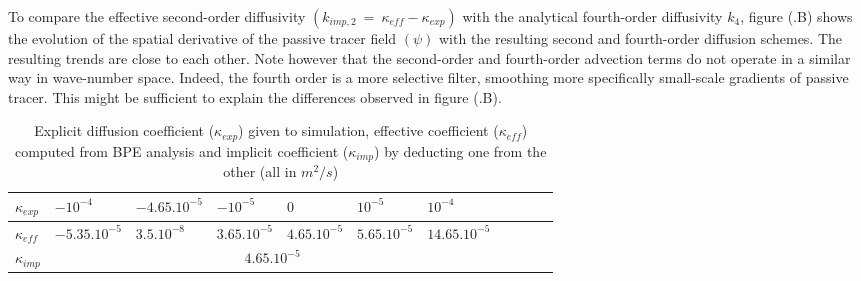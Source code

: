 To compare the effective second-order diffusivity $(k_{imp,2}\ =\ \kappa_{eff}-\kappa_{exp})$ with the analytical fourth-order diffusivity $k_4$, figure (.B) shows the evolution of the spatial derivative of the passive tracer field $(\psi)$ with the resulting second and fourth-order diffusion schemes. The resulting trends are close to each other.
Note however that the second-order and fourth-order advection terms do not operate in a similar way in wave-number space. Indeed, the fourth order is a more selective filter, smoothing more specifically small-scale gradients of passive tracer. This might be sufficient to explain the differences observed in figure (.B).
\begin{table}[h!]
\centering
\begin{tabular}{|l|l|l|l|l|l|l|l|l|l|l|}
\hline
$\kappa_{exp}$ & $-10^{-4}$ &$-4.65.10^{-5}$ & $-10^{-5}$& $0$& $10^{-5}$& $10^{-4}$\\
\hline
$\kappa_{eff}$ & $-5.35.10^{-5}$ &$3.5.10^{-8}$ & $3.65.10^{-5}$& $4.65.10^{-5}$& $5.65.10^{-5}$& $14.65.10^{-5}$\\
\hline
$\kappa_{imp}$&\multicolumn{6}{c|}{$4.65.10^{-5}$}\\
\hline
\end{tabular}
\caption{Explicit diffusion coefficient ($\kappa_{exp}$) given to simulation, effective coefficient ($\kappa_{eff}$) computed from BPE analysis and implicit coefficient ($\kappa_{imp}$) by deducting one from the other (all in $m^2/s$)}
\label{table_kappa}
\end{table}


